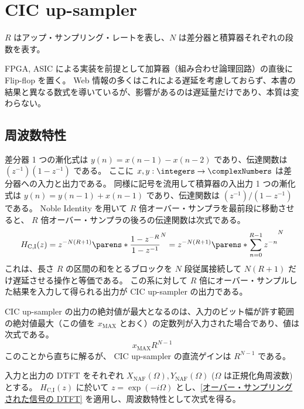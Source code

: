 \section{CIC up-sampler}
    \label{CIC up-sampler}
    \newcommand{\XNAF}{X_\text{NAF}}
    \newcommand{\YNAF}{Y_\text{NAF}}
    \newcommand{\tYNAF}{\tilde{Y}_\text{NAF}}
    \newcommand{\XNF}{X_\text{NF}}
    \newcommand{\YNF}{Y_\text{NF}}
    \newcommand{\tYNF}{\tilde{Y}_\text{NF}}

    $R$ はアップ・サンプリング・レートを表し、$N$ は差分器と積算器それぞれの段数を表す。
    \par
    FPGA, ASIC による実装を前提として加算器（組み合わせ論理回路）の直後に Flip-flop を置く。
    Web 情報の多くはこれによる遅延を考慮しておらず、本書の結果と異なる数式を導いているが、影響があるのは遅延量だけであり、本質は変わらない。
    \subsection{周波数特性}
        \label{CIC up-sampler の周波数特性}
        差分器 1 つの漸化式は $y(n) = x(n-1) - x(n-2)$ であり、伝達関数は $(z^{-1})(1-z^{-1})$ である。
        ここに $x,y:\integers\to\complexNumbers$ は差分器への入力と出力である。
        同様に記号を流用して積算器の入出力 1 つの漸化式は $y(n) = y(n-1) + x(n-1)$ であり、伝達関数は $(z^{-1})/(1-z^{-1})$ である。
        Noble Identity を用いて $R$ 倍オーバー・サンプラを最前段に移動させると、 $R$ 倍オーバー・サンプラの後ろの伝達関数は次式である。
        \[ H_\text{C,I}(z) = z^{-N(R+1)}\parens*{\frac{1-z^{-R}}{1-z^{-1}}}^N = z^{-N(R+1)}\parens*{\sum_{n=0}^{R-1} z^{-n}}^N \]
        これは、長さ $R$ の区間の和をとるブロックを $N$ 段従属接続して $N(R+1)$ だけ遅延させる操作と等価である。
        この系に対して $R$ 倍にオーバー・サンプルした結果を入力して得られる出力が CIC up-sampler の出力である。
        \par
        CIC up-sampler の出力の絶対値が最大となるのは、入力のビット幅が許す範囲の絶対値最大（この値を $x_\text{MAX}$ とおく）の定数列が入力された場合であり、値は次式である。
        \begin{equation}
            x_\text{MAX}R^{N-1}
            \label{equation:CIC up-sampler の出力の絶対値の最大値}
        \end{equation}
        このことから直ちに解るが、 CIC up-sampler の直流ゲインは $R^{N-1}$ である。
        \par
        入力と出力の DTFT をそれぞれ $\XNAF(\Omega), \YNAF(\Omega)$ ($\Omega$ は正規化角周波数) とする。
        $H_\text{C,I}(z)$ に於いて $z = \exp(-i\Omega)$ とし、\ref{オーバー・サンプリングされた信号の DTFT} を適用し、周波数特性として次式を得る。
